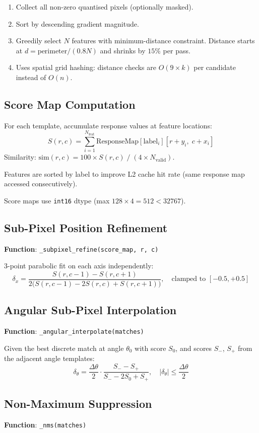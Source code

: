 \documentclass[11pt,a4paper]{article}
\begin{document}
\begin{enumerate}
\item Collect all non-zero quantised pixels (optionally masked).
\item Sort by descending gradient magnitude.
\item Greedily select $N$ features with minimum-distance constraint. Distance starts at $d = \text{perimeter} / (0.8N)$ and shrinks by $15\%$ per pass.
\item Uses spatial grid hashing: distance checks are $O(9 \times k)$ per candidate instead of $O(n)$.
\end{enumerate}

\subsection{Score Map Computation}
For each template, accumulate response values at feature locations:
\[
S(r,c) = \sum_{i=1}^{N_\text{feat}} \text{ResponseMap}[\text{label}_i][r + y_i,\; c + x_i]
\]
Similarity: $\text{sim}(r,c) = 100 \times S(r,c) \;/\; (4 \times N_\text{valid})$.

Features are sorted by label to improve L2 cache hit rate (same response map accessed consecutively).

Score maps use \texttt{int16} dtype (max $128 \times 4 = 512 < 32767$).

\subsection{Sub-Pixel Position Refinement}
\textbf{Function}: \texttt{\_subpixel\_refine(score\_map, r, c)}

3-point parabolic fit on each axis independently:
\[
\delta_x = \frac{S(r,c{-}1) - S(r,c{+}1)}{2\bigl(S(r,c{-}1) - 2S(r,c) + S(r,c{+}1)\bigr)}, \quad \text{clamped to } [-0.5, +0.5]
\]

\subsection{Angular Sub-Pixel Interpolation}
\textbf{Function}: \texttt{\_angular\_interpolate(matches)}

Given the best discrete match at angle $\theta_0$ with score $S_0$, and scores $S_{-}$, $S_{+}$ from the adjacent angle templates:
\[
\delta_\theta = \frac{\Delta\theta}{2} \cdot \frac{S_{-} - S_{+}}{S_{-} - 2S_0 + S_{+}}, \quad |\delta_\theta| \leq \frac{\Delta\theta}{2}
\]

\subsection{Non-Maximum Suppression}
\textbf{Function}: \texttt{\_nms(matches)}
\end{document}
